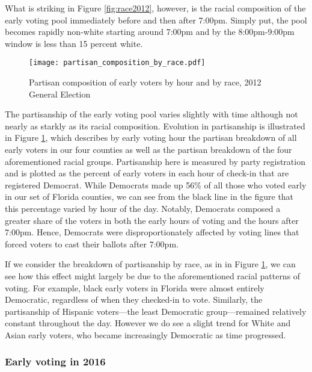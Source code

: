 \documentclass[12pt,titlepage]{article}
\begin{document}
What is striking in Figure \ref{fig:race2012}, however, is the racial
composition of the early voting pool immediately before and then after
7:00pm.  Simply put, the pool becomes rapidly non-white starting
around 7:00pm and by the 8:00pm-9:00pm window is less than 15 percent
white.

\begin{figure}[!ht]
\caption{Partisan composition of early voters by hour and by race, 2012
  General Election}
  \label{fig:party2012}
  \centering
    \centering\texttt{[image: partisan\_composition\_by\_race.pdf]}
\end{figure}

The partisanship of the early voting pool varies slightly with time
although not nearly as starkly as its racial composition.  Evolution
in partisanship is illustrated in Figure \ref{fig:party2012}, which
describes by early voting hour the partisan breakdown of all early
voters in our four counties as well as the partisan breakdown of the
four aforementioned racial groups.  Partisanship here is measured by
party registration and is plotted as the percent of early voters in
each hour of check-in that are registered Democrat.  While Democrats
made up 56\% of all those who voted early in our set of Florida
counties, we can see from the black line in the figure that this
percentage varied by hour of the day.  Notably, Democrats composed a
greater share of the voters in both the early hours of voting and the
hours after 7:00pm.  Hence, Democrats were disproportionately affected
by voting lines that forced voters to cast their ballots after 7:00pm.


If we consider the breakdown of partisanship by race, as in in Figure
\ref{fig:party2012}, we can see how this effect might largely be due
to the aforementioned racial patterns of voting.  For example, black
early voters in Florida were almost entirely Democratic, regardless of
when they checked-in to vote.  Similarly, the partisanship of Hispanic
voters---the least Democratic group---remained relatively constant
throughout the day.  However we do see a slight trend for White and
Asian early voters, who became increasingly Democratic as time
progressed.


\subsubsection*{Early voting in 2016}
\end{document}
